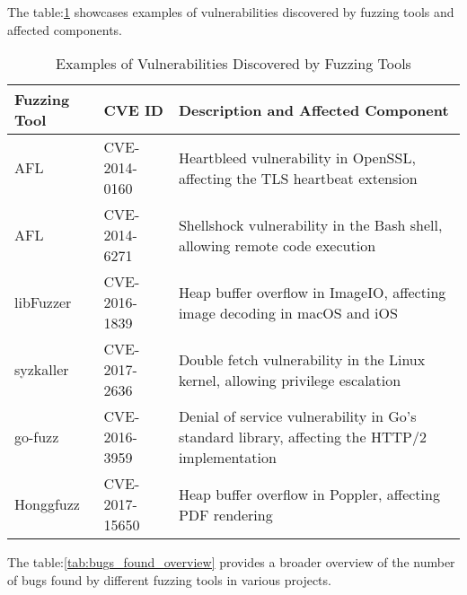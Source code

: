 The table:\ref{tab:vulnerabilities_examples} showcases examples of vulnerabilities discovered by
fuzzing tools and affected components.

\begin{table}[h!]
\centering
\begin{tabularx}{\textwidth}{@{}>{\raggedright\arraybackslash}p{2cm}>{\raggedright\arraybackslash}p{3cm}X@{}}
\toprule
\textbf{Fuzzing Tool} & \textbf{CVE ID} & \textbf{Description and Affected Component} \\
\midrule
AFL & CVE-2014-0160 & Heartbleed vulnerability in OpenSSL, affecting the TLS heartbeat extension\cite{durumeric2014matter} \\
\addlinespace
AFL & CVE-2014-6271 & Shellshock vulnerability in the Bash shell, allowing remote code execution\cite{shetty2018shellshock} \\
\addlinespace
libFuzzer & CVE-2016-1839  & Heap buffer overflow in ImageIO, affecting image decoding in macOS and iOS \\
\addlinespace
syzkaller & CVE-2017-2636  & Double fetch vulnerability in the Linux kernel, allowing privilege escalation\cite{wang2017double} \\
\addlinespace
go-fuzz & CVE-2016-3959  & Denial of service vulnerability in Go's standard library, affecting the HTTP/2 implementation \\
\addlinespace
Honggfuzz & CVE-2017-15650  & Heap buffer overflow in Poppler, affecting PDF rendering\cite{haller2013dowsing} \\
\bottomrule
\end{tabularx}
\caption{Examples of Vulnerabilities Discovered by Fuzzing Tools}
\label{tab:vulnerabilities_examples}
\end{table}

The table:\ref{tab:bugs_found_overview} provides a broader overview of the number of bugs found by
different fuzzing tools in various projects.

